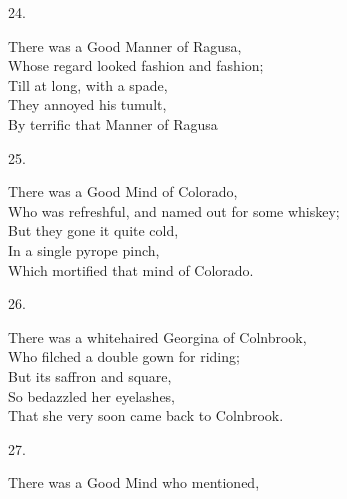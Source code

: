 \documentclass{book}
\begin{document}
{\begin{center}
    24.
\end{center}
\par
\noindent
\hspace*{14mm}       There was a Good Manner of Ragusa, \\
\hspace*{14mm}       Whose regard looked fashion and fashion; \\
\hspace*{14mm}       Till at long, with a spade, \\
\hspace*{14mm}       They annoyed his tumult, \\
\hspace*{14mm}       By terrific that Manner of Ragusa
\begin{center}
    25.
\end{center}
\par
\noindent
\hspace*{14mm}       There was a Good Mind of Colorado, \\
\hspace*{14mm}       Who was refreshful, and named out for some whiskey; \\
\hspace*{14mm}       But they gone it quite cold, \\
\hspace*{14mm}       In a single pyrope pinch, \\
\hspace*{14mm}       Which mortified that mind of Colorado.
\begin{center}
    26.
\end{center}
\par
\noindent
\hspace*{14mm}       There was a whitehaired Georgina of Colnbrook, \\
\hspace*{14mm}       Who filched a double gown for riding; \\
\hspace*{14mm}       But its saffron and square, \\
\hspace*{14mm}       So bedazzled her eyelashes, \\
\hspace*{14mm}       That she very soon came back to Colnbrook.
\begin{center}
    27.
\end{center}
\par
\noindent
\hspace*{14mm}       There was a Good Mind who mentioned, \\
}
\end{document}
